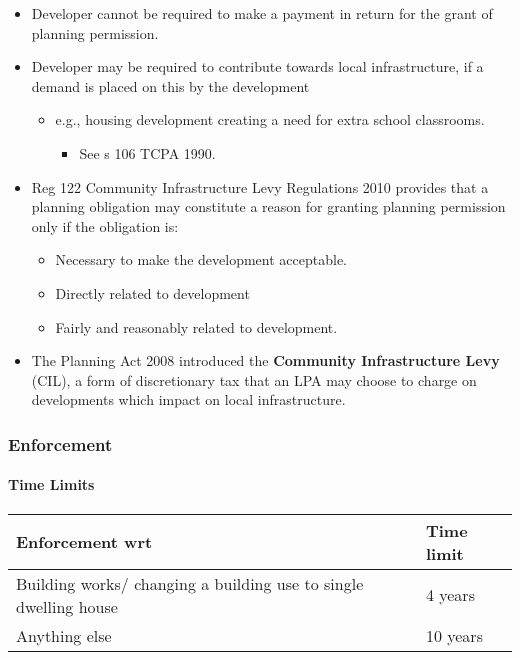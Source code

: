 \documentclass[
]{article}
\providecommand{\tightlist}{%
  \setlength{\itemsep}{0pt}\setlength{\parskip}{0pt}}
\begin{document}
\begin{itemize}
\tightlist
\item
  Developer cannot be required to make a payment in return for the grant
  of planning permission.
\item
  Developer may be required to contribute towards local infrastructure,
  if a demand is placed on this by the development

  \begin{itemize}
  \tightlist
  \item
    e.g., housing development creating a need for extra school
    classrooms.

    \begin{itemize}
    \tightlist
    \item
      See s 106 TCPA 1990.
    \end{itemize}
  \end{itemize}
\item
  Reg 122 Community Infrastructure Levy Regulations 2010 provides that a
  planning obligation may constitute a reason for granting planning
  permission only if the obligation is:

  \begin{itemize}
  \tightlist
  \item
    Necessary to make the development acceptable.
  \item
    Directly related to development
  \item
    Fairly and reasonably related to development.
  \end{itemize}
\item
  The Planning Act 2008 introduced the \textbf{Community Infrastructure
  Levy} (CIL), a form of discretionary tax that an LPA may choose to
  charge on developments which impact on local infrastructure.
\end{itemize}

\hypertarget{enforcement}{%
\subsubsection{Enforcement}\label{enforcement}}

\hypertarget{time-limits}{%
\paragraph{Time Limits}\label{time-limits}}

\begin{longtable}[]{@{}ll@{}}
\toprule()
Enforcement wrt & Time limit \\
\midrule()
\endhead
Building works/ changing a building use to single dwelling house & 4
years \\
Anything else & 10 years \\
\bottomrule()
\end{longtable}
\end{document}
